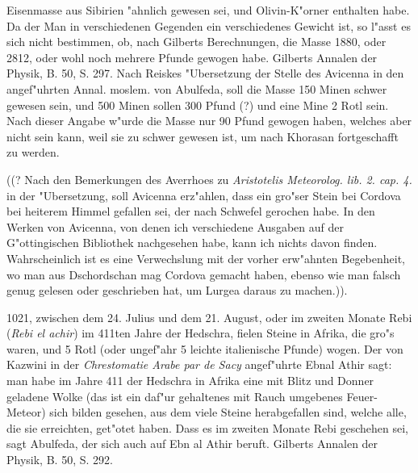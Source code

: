 \documentclass[a4paper, 11pt, oneside, polutonikogreek, german]{article}
\begin{document}
Eisenmasse aus Sibirien "ahnlich gewesen sei, und Olivin-K"orner enthalten habe. Da der Man in verschiedenen Gegenden ein verschiedenes Gewicht ist, so l"asst es sich nicht bestimmen, ob, nach Gilberts Berechnungen, die Masse 1880, oder 2812, oder wohl noch mehrere Pfunde gewogen habe. Gilberts Annalen der Physik, B. 50, S. 297. Nach Reiskes "Ubersetzung der Stelle des Avicenna in den angef"uhrten Annal. moslem. von Abulfeda, soll die Masse 150 Minen schwer gewesen sein, und 500 Minen sollen 300 Pfund (?) und eine Mine 2 Rotl sein. Nach dieser Angabe w"urde die Masse nur 90 Pfund gewogen haben, welches aber nicht sein kann, weil sie zu schwer gewesen ist, um nach Khorasan fortgeschafft zu werden.

((? Nach den Bemerkungen des Averrhoes zu \emph{Aristotelis Meteorolog. lib. 2. cap. 4.} in der "Ubersetzung, soll Avicenna erz"ahlen, dass ein gro"ser Stein bei Cordova bei heiterem Himmel gefallen sei, der nach Schwefel gerochen habe. In den Werken von Avicenna, von denen ich verschiedene Ausgaben auf der G"ottingischen Bibliothek nachgesehen habe, kann ich nichts davon finden. Wahrscheinlich ist es eine Verwechslung mit der vorher erw"ahnten Begebenheit, wo man aus Dschordschan mag Cordova gemacht haben, ebenso wie man falsch genug gelesen oder geschrieben hat, um Lurgea daraus zu machen.)).

1021, zwischen dem 24. Julius und dem 21. August, oder im zweiten Monate Rebi (\emph{Rebi el achir}) im 411ten Jahre der Hedschra, fielen Steine in Afrika, die gro"s waren, und 5 Rotl (oder ungef"ahr 5 leichte italienische Pfunde) wogen. Der von Kazwini in der \emph{Chrestomatie Arabe par de Sacy} angef"uhrte Ebnal Athir sagt: man habe im Jahre 411 der Hedschra in Afrika eine mit Blitz und Donner geladene Wolke (das ist ein daf"ur gehaltenes mit Rauch umgebenes Feuer-Meteor) sich bilden gesehen, aus dem viele Steine herabgefallen sind, welche alle, die sie erreichten, get"otet haben. Dass es im zweiten Monate Rebi geschehen sei, sagt Abulfeda, der sich auch auf Ebn al Athir beruft. Gilberts Annalen der Physik, B. 50, S. 292.
\end{document}
